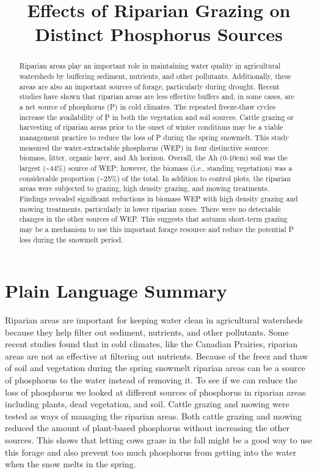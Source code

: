 \documentclass[
]{agujournal2019}
\begin{document}
\title{Effects of Riparian Grazing on Distinct Phosphorus Sources}



\begin{abstract}
Riparian areas play an important role in maintaining water quality in
agricultural watersheds by buffering sediment, nutrients, and other
pollutants. Additionally, these areas are also an important sources of
forage, particularly during drought. Recent studies have shown that
riparian areas are less effective buffers and, in some cases, are a net
source of phosphorus (P) in cold climates. The repeated freeze-thaw
cycles increase the availability of P in both the vegetation and soil
sources. Cattle grazing or harvesting of riparian areas prior to the
onset of winter conditions may be a viable management practice to reduce
the loss of P during the spring snowmelt. This study measured the
water-extractable phosphorus (WEP) in four distinctive sources: biomass,
litter, organic layer, and Ah horizon. Overall, the Ah (0-10cm) soil was
the largest (\textasciitilde44\%) source of WEP; however, the biomass
(i.e., standing vegetation) was a considerable proportion
(\textasciitilde25\%) of the total. In addition to control plots, the
riparian areas were subjected to grazing, high density grazing, and
mowing treatments. Findings revealed significant reductions in biomass
WEP with high density grazing and mowing treatments, particularly in
lower riparian zones. There were no detectable changes in the other
sources of WEP. This suggests that autumn short-term grazing may be a
mechanism to use this important forage resource and reduce the potential
P loss during the snowmelt period.
\end{abstract}

\section*{Plain Language Summary}
Riparian areas are important for keeping water clean in agricultural
watersheds because they help filter out sediment, nutrients, and other
pollutants. Some recent studies found that in cold climates, like the
Canadian Prairies, riparian areas are not as effective at filtering out
nutrients. Because of the freez and thaw of soil and vegetation during
the spring snowmelt riparian areas can be a source of phosphorus to the
water instead of removing it. To see if we can reduce the loss of
phosphorus we looked at different sources of phosphorus in riparian
areas including plants, dead vegetation, and soil. Cattle grazing and
mowing were tested as ways of managing the riparian areas. Both cattle
grazing and mowing reduced the amount of plant-based phosphorus without
increasing the other sources. This shows that letting cows graze in the
fall might be a good way to use this forage and also prevent too much
phosphorus from getting into the water when the snow melts in the
spring.
\end{document}
